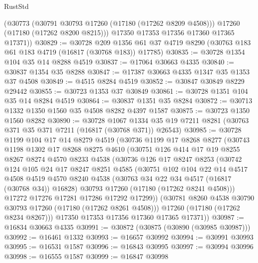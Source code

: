 \begin{lexlean}{RustStd}
\begin{coremodule}
        (@30773
          (@30791 @30793 @17260 (@17180 (@17262 @8209 @4508)))
          @17260
          (@17180 (@17262 @8200 @8215)))
        @17350
        @17353
        @17356
        @17360
        @17365
        @17371))
@30829 := @30728
    @209
    @1356
    @61
    @37
    @4719
    @8290
    (@30763 @183 @61 @183 @4719 (@16817 (@30768 @183)) @17785)
@30835 := @30728 @1354 @104 @35 @14 @8288 @4519
@30837 := @17064 @30663 @4335
@30840 := @30837 @1354 @35 @8288
@30847 := @17387 @30663 @4335 @1347 @35 @1353 @37 @4508
@30849 := @4515 @8284 @4519
@30852 := @30847 @30849 @8229 @29442
@30855 := @30723 @1353 @37 @30849
@30861 := @30728 @1351 @104 @35 @14 @8284 @4519
@30864 := @30837 @1351 @35 @8284
@30872 := @30713 @1332 @1350 @1560 @35 @4508 @8282 @4397 @1587
@30875 := @30723 @1350 @1560 @8282
@30890 := @30728
    @1067
    @1334
    @35
    @19
    @7211
    @8281
    (@30763 @371 @35 @371 @7211 (@16817 (@30768 @371)) @26543)
@30985 := @30728
    @1199
    @104
    @17
    @14
    @8279
    @4519
    (@30736
      @1199
      @17
      @8268
      @8277
      (@30743
        @1198
        @1302
        @17
        @8268
        @8275
        @4610
        (@30751
          @126
          @414
          @17
          @19
          @8255
          @8267
          @8274
          @4570
          @8233
          @4538
          (@30736
            @126
            @17
            @8247
            @8253
            (@30742
              @124
              @105
              @24
              @17
              @8247
              @8251
              @4585
              (@30751
                @102
                @104
                @22
                @14
                @4517
                @4508
                @4519
                @4570
                @8240
                @4538
                (@30763 @34 @22 @34 @4517 (@16817 (@30768 @34)) @16828)
                @30793
                @17260
                (@17180 (@17262 @8241 @4508)))
              @17272
              @17276
              @17281
              @17286
              @17292
              @17299))
          (@30781 @8260 @4538 @30790 @30793 @17260 (@17180 (@17262 @8261 @4508)))
          @17260
          (@17180 (@17262 @8234 @8267)))
        @17350
        @17353
        @17356
        @17360
        @17365
        @17371))
@30987 := @16834 @30663 @4335
@30991 := @30872 (@30875 (@30890 (@30985 @30987)))
@30992 := @16461 @1332
@30993 := @16657 @30992
@30994 := @30991 @30993
@30995 := @16531 @1587
@30996 := @16843 @30995
@30997 := @30994 @30996
@30998 := @16555 @1587
@30999 := @16847 @30998

\end{coremodule}
\end{lexlean}

